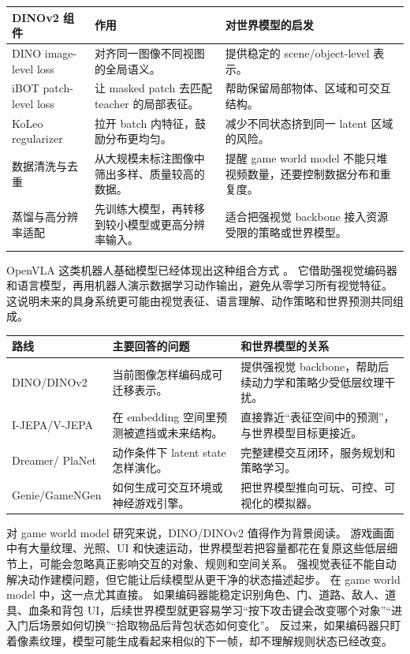 \documentclass[11pt,a4paper]{ctexart}
\begin{document}
\begin{longtable}{p{} p{} p{}}
\toprule
DINOv2 组件 & 作用 & 对世界模型的启发 \\
\midrule
DINO image-level loss & 对齐同一图像不同视图的全局语义。 & 提供稳定的 scene/object-level 表示。 \\
iBOT patch-level loss & 让 masked patch 去匹配 teacher 的局部表征。 & 帮助保留局部物体、区域和可交互结构。 \\
KoLeo regularizer & 拉开 batch 内特征，鼓励分布更均匀。 & 减少不同状态挤到同一 latent 区域的风险。 \\
数据清洗与去重 & 从大规模未标注图像中筛出多样、质量较高的数据。 & 提醒 game world model 不能只堆视频数量，还要控制数据分布和重复度。 \\
蒸馏与高分辨率适配 & 先训练大模型，再转移到较小模型或更高分辨率输入。 & 适合把强视觉 backbone 接入资源受限的策略或世界模型。 \\
\bottomrule
\end{longtable}

OpenVLA 这类机器人基础模型已经体现出这种组合方式 \cite{kim2024openvla}。
它借助强视觉编码器和语言模型，再用机器人演示数据学习动作输出，避免从零学习所有视觉特征。
这说明未来的具身系统更可能由视觉表征、语言理解、动作策略和世界预测共同组成。

\begin{longtable}{p{} p{} p{}}
\toprule
路线 & 主要回答的问题 & 和世界模型的关系 \\
\midrule
DINO/DINOv2 & 当前图像怎样编码成可迁移表示。 & 提供强视觉 backbone，帮助后续动力学和策略少受低层纹理干扰。 \\
I-JEPA/V-JEPA & 在 embedding 空间里预测被遮挡或未来结构。 & 直接靠近“表征空间中的预测”，与世界模型目标更接近。 \\
Dreamer/ PlaNet & 动作条件下 latent state 怎样演化。 & 完整建模交互闭环，服务规划和策略学习。 \\
Genie/GameNGen & 如何生成可交互环境或神经游戏引擎。 & 把世界模型推向可玩、可控、可视化的模拟器。 \\
\bottomrule
\end{longtable}

对 game world model 研究来说，DINO/DINOv2 值得作为背景阅读。
游戏画面中有大量纹理、光照、UI 和快速运动，世界模型若把容量都花在复原这些低层细节上，可能会忽略真正影响交互的对象、规则和空间关系。
强视觉表征不能自动解决动作建模问题，但它能让后续模型从更干净的状态描述起步。
在 game world model 中，这一点尤其直接。
如果编码器能稳定识别角色、门、道路、敌人、道具、血条和背包 UI，后续世界模型就更容易学习“按下攻击键会改变哪个对象”“进入门后场景如何切换”“拾取物品后背包状态如何变化”。
反过来，如果编码器只盯着像素纹理，模型可能生成看起来相似的下一帧，却不理解规则状态已经改变。
\end{document}
